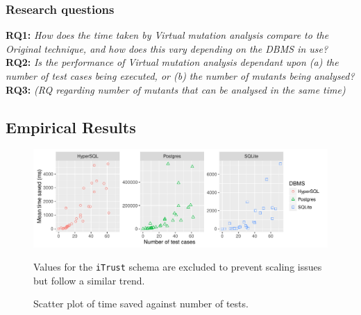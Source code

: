 \subsubsection{Research questions}

\textbf{RQ1: }\emph{How does the time taken by Virtual mutation analysis compare to the Original technique, and how does
this vary depending on the DBMS in use?}\\

\textbf{RQ2: }\emph{Is the performance of Virtual mutation analysis dependant upon (a) the number of test cases being
executed, or (b) the number of mutants being analysed?}\\

\textbf{RQ3: }\emph{(RQ regarding number of mutants that can be analysed in the same time)}\\

\subsection{Empirical Results}

\begin{table}[t]
  \caption{\label{tbl:time_saved_by_dbms_table}
    Time saving summary.
  }\vspace{1em}
  \scriptsize
  \centering
\end{table}


\begin{figure}[t]
  \centering
  \includegraphics[width=6in]{graphics/time_saved_vs_tests_scatter_noitrust_facetdbms.pdf}
  \caption{Scatter plot of time saved against number of tests.}
  {\small Values for the \texttt{iTrust} schema are excluded to prevent scaling issues but follow a similar trend.}
\end{figure}

